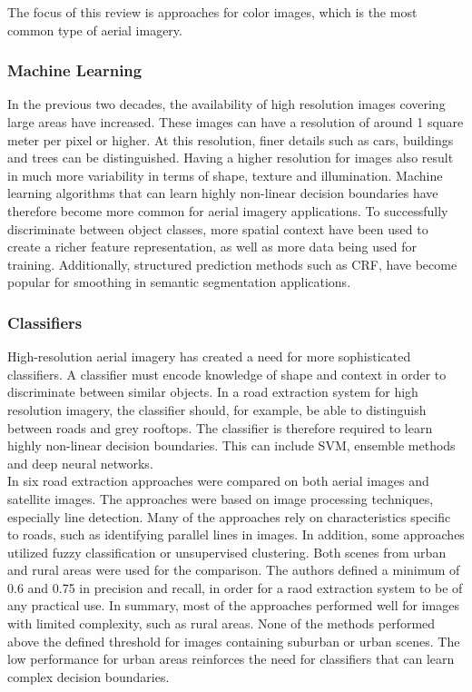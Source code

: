The focus of this review is approaches for color images, which is the most common type of aerial imagery.

\subsubsection{Machine Learning}
In the previous two decades, the availability of high resolution images covering large areas have increased. These images can have a resolution of around 1 square meter per pixel or higher. At this resolution, finer details such as cars, buildings and trees can be distinguished. Having a higher resolution for images also result in much more variability in terms of shape, texture and illumination. Machine learning algorithms that can learn highly non-linear decision boundaries have therefore become more common for aerial imagery applications. To successfully discriminate between object classes, more spatial context have been used to create a richer feature representation, as well as more data being used for training. Additionally, structured prediction methods such as \ac{CRF}, have become popular for smoothing in semantic segmentation applications.


\subsubsection{Classifiers}
High-resolution aerial imagery has created a need for more sophisticated classifiers. A classifier must encode knowledge of shape and context in order to discriminate between similar objects. In a road extraction system for high resolution imagery, the classifier should, for example, be able to distinguish between roads and grey rooftops. The classifier is therefore required to learn highly non-linear decision boundaries. This can include \ac{SVM}, ensemble methods and deep neural networks.\\

In \cite{Mayer_road_test} six road extraction approaches were compared on both aerial images and satellite images. The approaches were based on image processing techniques, especially line detection. Many of the approaches rely on characteristics specific to roads, such as identifying parallel lines in images. In addition, some approaches utilized fuzzy classification or unsupervised clustering. Both scenes from urban and rural areas were used for the comparison. The authors defined a minimum of 0.6 and 0.75 in precision and recall, in order for a raod extraction system to be of any practical use. In summary, most of the approaches performed well for images with limited complexity, such as rural areas. None of the methods performed above the defined threshold for images containing suburban or urban scenes. The low performance for urban areas reinforces the need for classifiers that can learn complex decision boundaries.\\

